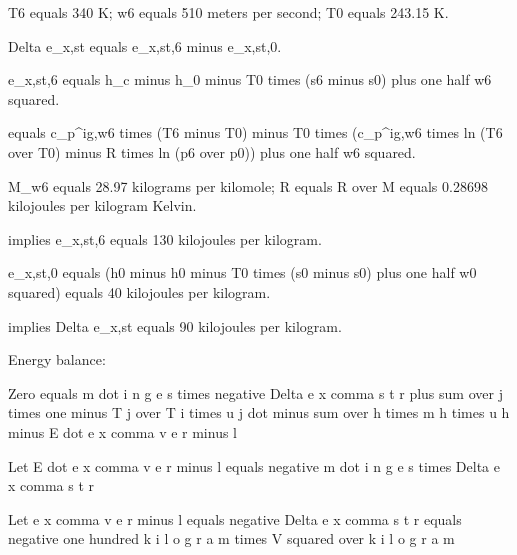 T6 equals 340 K; w6 equals 510 meters per second; T0 equals 243.15 K.

Delta e_x,st equals e_x,st,6 minus e_x,st,0.

e_x,st,6 equals h_c minus h_0 minus T0 times (s6 minus s0) plus one half w6 squared.

equals c_p^ig,w6 times (T6 minus T0) minus T0 times (c_p^ig,w6 times ln (T6 over T0) minus R times ln (p6 over p0)) plus one half w6 squared.

M_w6 equals 28.97 kilograms per kilomole; R equals R over M equals 0.28698 kilojoules per kilogram Kelvin.

implies e_x,st,6 equals 130 kilojoules per kilogram.

e_x,st,0 equals (h0 minus h0 minus T0 times (s0 minus s0) plus one half w0 squared) equals 40 kilojoules per kilogram.

implies Delta e_x,st equals 90 kilojoules per kilogram.

Energy balance:

Zero equals m dot i n g e s times negative Delta e x comma s t r plus sum over j times one minus T j over T i times u j dot minus sum over h times m h times u h minus E dot e x comma v e r minus l

Let E dot e x comma v e r minus l equals negative m dot i n g e s times Delta e x comma s t r

Let e x comma v e r minus l equals negative Delta e x comma s t r equals negative one hundred k i l o g r a m times V squared over k i l o g r a m